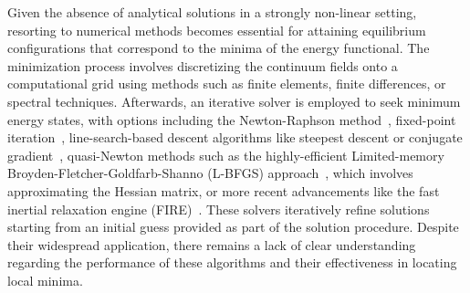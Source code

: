 Given the absence of analytical solutions in a strongly non-linear setting, resorting to numerical methods becomes essential for attaining equilibrium configurations that correspond to the minima of the energy functional. The minimization process involves discretizing the continuum fields onto a computational grid using methods such as finite elements, finite differences, or spectral techniques. Afterwards, an iterative solver is employed to seek minimum energy states, with options including the Newton-Raphson method~\cite{Wick2017-bo}, fixed-point iteration~\cite{Chen2019-mn,Kirkesaether_Brun2020-wa,Storvik2021-cd}, line-search-based descent algorithms like steepest descent or conjugate gradient~\cite{Stiefel1952-fw,Dai1999-hz}, quasi-Newton methods such as the highly-efficient Limited-memory Broyden-Fletcher-Goldfarb-Shanno (\textsc{L-BFGS}) approach~\cite{Liu1989-kl}, which involves approximating the Hessian matrix, or more recent advancements like the fast inertial relaxation engine (\textsc{FIRE})~\cite{Guenole2020-tc}. These solvers iteratively refine solutions starting from an initial guess provided as part of the solution procedure. Despite their widespread application, there remains a lack of clear understanding regarding the performance of these algorithms and their effectiveness in locating local minima. 


